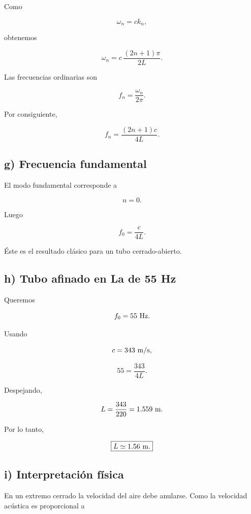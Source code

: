 \documentclass[11pt,spanish]{article}
\begin{document}
Como

\[
\omega_n=ck_n,
\]

obtenemos

\[
\omega_n
=
c\,
\frac{(2n+1)\pi}{2L}.
\]

Las frecuencias ordinarias son

\[
f_n
=
\frac{\omega_n}{2\pi}.
\]

Por consiguiente,

\[
\boxed{
f_n
=
\frac{(2n+1)c}{4L}.
}
\]


\subsection*{g) Frecuencia fundamental}

El modo fundamental corresponde a

\[
n=0.
\]

Luego

\[
\boxed{
f_0
=
\frac{c}{4L}.
}
\]

Éste es el resultado clásico para un tubo cerrado-abierto.


\subsection*{h) Tubo afinado en La de 55 Hz}

Queremos

\[
f_0=55\ {\rm Hz}.
\]

Usando

\[
c=343\ {\rm m/s},
\]

\[
55
=
\frac{343}{4L}.
\]

Despejando,

\[
L
=
\frac{343}{220}
=
1.559\ {\rm m}.
\]

Por lo tanto,

\[
\boxed{
L\simeq1.56\ {\rm m}.
}
\]


\subsection*{i) Interpretación física}

En un extremo cerrado la velocidad del aire debe anularse.
Como la velocidad acústica es proporcional a
\end{document}
